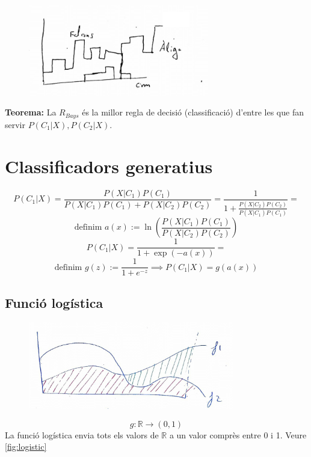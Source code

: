 \documentclass[a4paper]{article}
\begin{document}
\begin{figure}[H]
	\centering
	\includegraphics[width=0.7\textwidth]{images/tema_5-4}
\end{figure}

\textbf{Teorema:} La $R_{Bays}$ és la millor regla de decisió (classificació) d'entre les que fan servir $P(C_1|X), P(C_2|X)$.

\section{Classificadors generatius}

$$
P(C_1|X) = \frac{P(X|C_1)P(C_1)}{P(X|C_1)P(C_1) + P(X|C_2)P(C_2)} = 
\frac{1}{1 + \frac{P(X|C_2)P(C_2)}{P(X|C_1)P(C_1)}} =
$$
$$
\text{definim } a(x) := \ln \left( \frac{P(X|C_1)P(C_1)}{P(X|C_2)P(C_2)} \right)
$$
$$
P(C_1|X) = \frac{1}{1 + \exp(-a(x))} = 
$$
$$
\text{definim } g(z) := \frac{1}{1 + e^{-z}} \implies P(C_1|X) = g(a(x))
$$


\subsection{Funció logística}

\begin{figure}[H]
	\centering
	\includegraphics[width=0.8\textwidth]{images/tema_5-5}
\end{figure}

$$
g:\mathbb{R} \rightarrow (0,1)
$$
La funció logística envia tots els valors de $\mathbb{R}$ a un valor comprès entre 0 i 1. Veure \autoref{fig:logistic}
\end{document}
